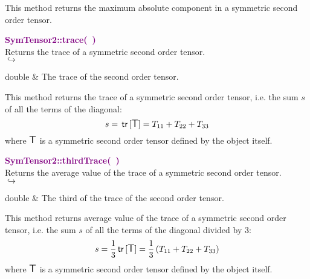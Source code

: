 This method returns the maximum absolute component in a symmetric second order tensor.

\textcolor{purple}{\textbf{SymTensor2::trace(~)}}\label{SymTensor2::trace()}\\
Returns the trace of a symmetric second order tensor.\\ \hspace*{5mm}$\hookrightarrow$
\vspace*{-2em}\begin{tcolorbox}[grow to left by=-1cm, width=\textwidth-1cm,myArgs,tabularx={l|R}]
double & The trace of the second order tensor.
\end{tcolorbox}

This method returns the trace of a symmetric second order tensor, i.e. the sum $s$ of all the terms of the diagonal:
\begin{equation*}
s = \mbox{\ensuremath{\mathsf{\,tr\,}}}[\mbox{\large\ensuremath{\mathsf{T}}}] = T_{11}+T_{22}+T_{33}
\end{equation*}
where $\mbox{\large\ensuremath{\mathsf{T}}}$ is a symmetric second order tensor defined by the object itself.

\textcolor{purple}{\textbf{SymTensor2::thirdTrace(~)}}\label{SymTensor2::thirdTrace()}\\
Returns the average value of the trace of a symmetric second order tensor.\\ \hspace*{5mm}$\hookrightarrow$
\vspace*{-2em}\begin{tcolorbox}[grow to left by=-1cm, width=\textwidth-1cm,myArgs,tabularx={l|R}]
double & The third of the trace of the second order tensor.
\end{tcolorbox}

This method returns average value of the trace of a symmetric second order tensor, i.e. the sum $s$ of all the terms of the diagonal divided by 3:
\begin{equation*}
s = \frac{1}{3} \mbox{\ensuremath{\mathsf{\,tr\,}}}[\mbox{\large\ensuremath{\mathsf{T}}}] =  \frac{1}{3} \left( T_{11}+T_{22}+T_{33} \right)
\end{equation*}
where $\mbox{\large\ensuremath{\mathsf{T}}}$ is a symmetric second order tensor defined by the object itself.

